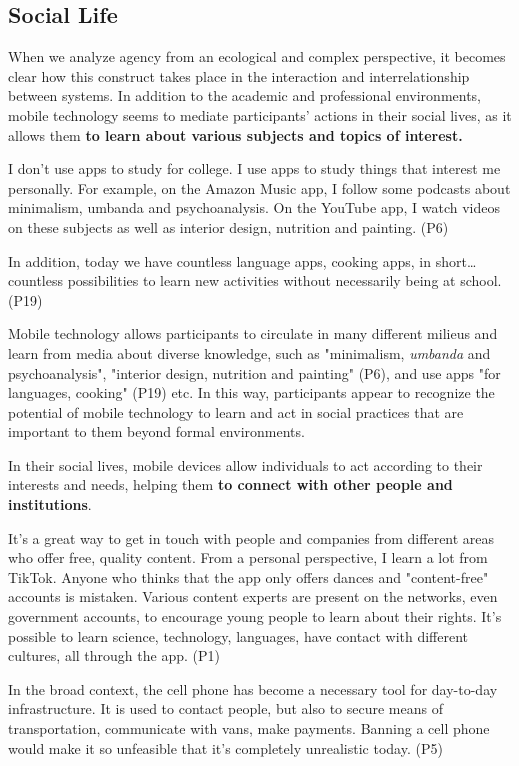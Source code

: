 \subsection{Social Life}

When we analyze agency from an ecological and complex perspective, it
becomes clear how this construct takes place in the interaction and
interrelationship between systems. In addition to the academic and
professional environments, mobile technology seems to mediate
participants' actions in their social lives, as it
allows them \textbf{to learn about various subjects and topics of
interest.}

I don't use apps to study for college. I use apps to
study things that interest me personally. For example, on the Amazon
Music app, I follow some podcasts about minimalism, umbanda and
psychoanalysis. On the YouTube app, I watch videos on these subjects as
well as interior design, nutrition and painting. (P6)

In addition, today we have countless language apps, cooking apps, in
short\ldots{} countless possibilities to learn new activities without
necessarily being at school. (P19)

Mobile technology allows participants to circulate in many different
milieus and learn from media about diverse knowledge, such as
"minimalism, \emph{umbanda} and psychoanalysis", "interior design,
nutrition and painting" (P6), and use apps "for languages, cooking"
(P19) etc. In this way, participants appear to recognize the potential
of mobile technology to learn and act in social practices that are
important to them beyond formal environments.

In their social lives, mobile devices allow individuals to act according
to their interests and needs, helping them \textbf{to connect with other
people and institutions}.

It's a great way to get in touch with people and
companies from different areas who offer free, quality content. From a
personal perspective, I learn a lot from TikTok. Anyone who thinks that
the app only offers dances and "content-free" accounts is mistaken.
Various content experts are present on the networks, even government
accounts, to encourage young people to learn about their rights.
It's possible to learn science, technology, languages,
have contact with different cultures, all through the app. (P1)

In the broad context, the cell phone has become a necessary tool for
day-to-day infrastructure. It is used to contact people, but also to
secure means of transportation, communicate with vans, make payments.
Banning a cell phone would make it so unfeasible that
it's completely unrealistic today. (P5)

